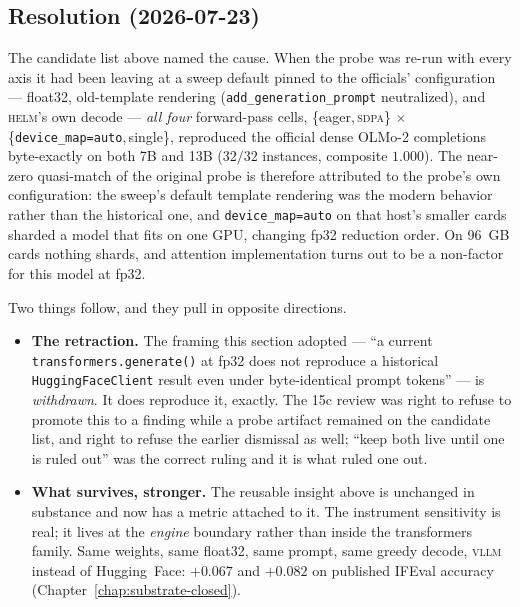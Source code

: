 \documentclass[11pt]{report}
\newcommand{\code}[1]{\texttt{#1}}
\begin{document}
\subsection*{Resolution (2026-07-23)}

The candidate list above named the cause. When the probe was re-run with every axis
it had been leaving at a sweep default pinned to the officials' configuration ---
float32, old-template rendering (\code{add\_generation\_prompt} neutralized), and
\textsc{helm}'s own decode --- \emph{all four} forward-pass cells,
\{eager,\,\textsc{sdpa}\} $\times$ \{\code{device\_map=auto},\,single\}, reproduced
the official dense OLMo-2 completions byte-exactly on both 7B and 13B ($32/32$
instances, composite $1.000$). The near-zero quasi-match of the original probe is
therefore attributed to the probe's own configuration: the sweep's default template
rendering was the modern behavior rather than the historical one, and
\code{device\_map=auto} on that host's smaller cards sharded a model that fits on
one GPU, changing fp32 reduction order. On 96~GB cards nothing shards, and attention
implementation turns out to be a non-factor for this model at fp32.

Two things follow, and they pull in opposite directions.

\begin{itemize}[nosep]
  \item \textbf{The retraction.} The framing this section adopted --- ``a current
        \code{transformers.generate()} at fp32 does not reproduce a historical
        \code{HuggingFaceClient} result even under byte-identical prompt tokens''
        --- is \emph{withdrawn}. It does reproduce it, exactly. The 15c review was
        right to refuse to promote this to a finding while a probe artifact
        remained on the candidate list, and right to refuse the earlier dismissal
        as well; ``keep both live until one is ruled out'' was the correct ruling
        and it is what ruled one out.
  \item \textbf{What survives, stronger.} The reusable insight above is unchanged in
        substance and now has a metric attached to it. The instrument sensitivity is
        real; it lives at the \emph{engine} boundary rather than inside the
        transformers family. Same weights, same float32, same prompt, same greedy
        decode, \textsc{vllm} instead of Hugging~Face: $+0.067$ and $+0.082$ on
        published IFEval accuracy (Chapter~\ref{chap:substrate-closed}).
\end{itemize}
\end{document}

